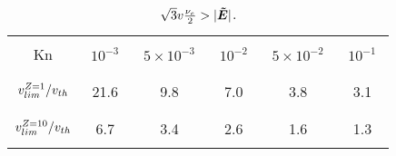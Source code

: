
\begin{table}
\begin{center}
  \begin{tabular}{c|ccccc}
    \hline\hline\\
    Kn & $\,\,10^{-3}\,\,$ & $\,\,5\times10^{-3}\,\,$ & $\,\,10^{-2}\,\,$ & $\,\,5\times10^{-2}\,\,$ & $\,\,10^{-1}\,\,$ \\\\
    \hline\\
    $v_{lim}^{Z=1} / v_{th}$ & 21.6 & 9.8 & 7.0 & 3.8 & 3.1 \\\\
    \hline\\
    $v_{lim}^{Z=10} / v_{th}$ & 6.7 & 3.4 & 2.6 & 1.6 & 1.3 \\\\
    \hline\hline
  \end{tabular}
  \caption{
  $\sqrt{3}v\frac{\nu_{e}}{2} > |\boldsymbol{\tilde{E}}|$.
  }
\end{center}
\label{tab:vlim}
\end{table}

